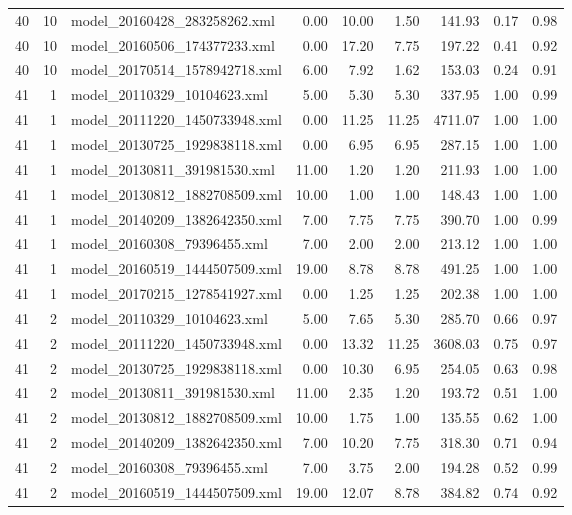 \begin{table}[ht]
\begin{tabular}{rrlrrrrrr}
   40 &  10 & model\_20160428\_283258262.xml & 0.00 & 10.00 & 1.50 & 141.93 & 0.17 & 0.98 \\ 
   40 &  10 & model\_20160506\_174377233.xml & 0.00 & 17.20 & 7.75 & 197.22 & 0.41 & 0.92 \\ 
   40 &  10 & model\_20170514\_1578942718.xml & 6.00 & 7.92 & 1.62 & 153.03 & 0.24 & 0.91 \\ 
   41 &   1 & model\_20110329\_10104623.xml & 5.00 & 5.30 & 5.30 & 337.95 & 1.00 & 0.99 \\ 
   41 &   1 & model\_20111220\_1450733948.xml & 0.00 & 11.25 & 11.25 & 4711.07 & 1.00 & 1.00 \\ 
   41 &   1 & model\_20130725\_1929838118.xml & 0.00 & 6.95 & 6.95 & 287.15 & 1.00 & 1.00 \\ 
   41 &   1 & model\_20130811\_391981530.xml & 11.00 & 1.20 & 1.20 & 211.93 & 1.00 & 1.00 \\ 
   41 &   1 & model\_20130812\_1882708509.xml & 10.00 & 1.00 & 1.00 & 148.43 & 1.00 & 1.00 \\ 
   41 &   1 & model\_20140209\_1382642350.xml & 7.00 & 7.75 & 7.75 & 390.70 & 1.00 & 0.99 \\ 
   41 &   1 & model\_20160308\_79396455.xml & 7.00 & 2.00 & 2.00 & 213.12 & 1.00 & 1.00 \\ 
   41 &   1 & model\_20160519\_1444507509.xml & 19.00 & 8.78 & 8.78 & 491.25 & 1.00 & 1.00 \\ 
   41 &   1 & model\_20170215\_1278541927.xml & 0.00 & 1.25 & 1.25 & 202.38 & 1.00 & 1.00 \\ 
   41 &   2 & model\_20110329\_10104623.xml & 5.00 & 7.65 & 5.30 & 285.70 & 0.66 & 0.97 \\ 
   41 &   2 & model\_20111220\_1450733948.xml & 0.00 & 13.32 & 11.25 & 3608.03 & 0.75 & 0.97 \\ 
   41 &   2 & model\_20130725\_1929838118.xml & 0.00 & 10.30 & 6.95 & 254.05 & 0.63 & 0.98 \\ 
   41 &   2 & model\_20130811\_391981530.xml & 11.00 & 2.35 & 1.20 & 193.72 & 0.51 & 1.00 \\ 
   41 &   2 & model\_20130812\_1882708509.xml & 10.00 & 1.75 & 1.00 & 135.55 & 0.62 & 1.00 \\ 
   41 &   2 & model\_20140209\_1382642350.xml & 7.00 & 10.20 & 7.75 & 318.30 & 0.71 & 0.94 \\ 
   41 &   2 & model\_20160308\_79396455.xml & 7.00 & 3.75 & 2.00 & 194.28 & 0.52 & 0.99 \\ 
   41 &   2 & model\_20160519\_1444507509.xml & 19.00 & 12.07 & 8.78 & 384.82 & 0.74 & 0.92 \\ 

\end{tabular}
\end{table}
